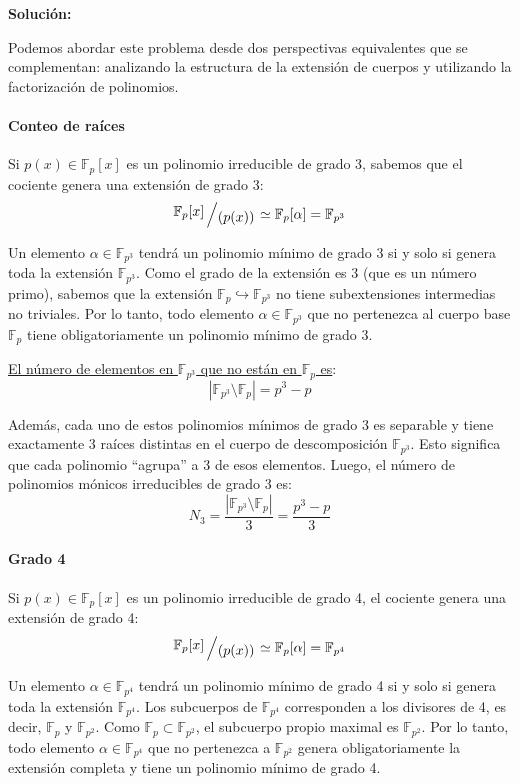 \begin{enumerate}
\begin{dem}
        \noindent\textbf{Solución:}

Podemos abordar este problema desde dos perspectivas equivalentes que se complementan: analizando la estructura de la extensión de cuerpos y utilizando la factorización de polinomios.

\paragraph{Conteo de raíces}
Si $p(x) \in \mathbb{F}_p[x]$ es un polinomio irreducible de grado 3, sabemos que el cociente genera una extensión de grado 3: 
\[ \modulo{\mathbb{F}_p[x]}{(p(x))} \simeq \mathbb{F}_p[\alpha] = \mathbb{F}_{p^3} \]

Un elemento $\alpha \in \mathbb{F}_{p^3}$ tendrá un polinomio mínimo de grado 3 si y solo si genera toda la extensión $\mathbb{F}_{p^3}$. 
Como el grado de la extensión es 3 (que es un número primo), sabemos que la extensión $\mathbb{F}_p \hookrightarrow \mathbb{F}_{p^3}$ no tiene subextensiones intermedias no triviales. Por lo tanto, todo elemento $\alpha \in \mathbb{F}_{p^3}$ que no pertenezca al cuerpo base $\mathbb{F}_p$ tiene obligatoriamente un polinomio mínimo de grado 3.

\underline{El número de elementos en $\mathbb{F}_{p^3}$ que no están en $\mathbb{F}_p$ es}:
\[ |\mathbb{F}_{p^3} \setminus \mathbb{F}_p| = p^3 - p \]

Además, cada uno de estos polinomios mínimos de grado 3 es separable y tiene exactamente 3 raíces distintas en el cuerpo de descomposición $\mathbb{F}_{p^3}$. Esto significa que cada polinomio ``agrupa'' a 3 de esos elementos.
Luego, el número de polinomios mónicos irreducibles de grado 3 es:
\[ N_3 = \frac{|\mathbb{F}_{p^3} \setminus \mathbb{F}_p|}{3} = \frac{p^3 - p}{3} \]

\paragraph{Grado 4}
Si $p(x) \in \mathbb{F}_p[x]$ es un polinomio irreducible de grado 4, el cociente genera una extensión de grado 4: 
\[ \modulo{\mathbb{F}_p[x]}{(p(x))} \simeq \mathbb{F}_p[\alpha] = \mathbb{F}_{p^4} \]

Un elemento $\alpha \in \mathbb{F}_{p^4}$ tendrá un polinomio mínimo de grado 4 si y solo si genera toda la extensión $\mathbb{F}_{p^4}$. 
Los subcuerpos de $\mathbb{F}_{p^4}$ corresponden a los divisores de 4, es decir, $\mathbb{F}_p$ y $\mathbb{F}_{p^2}$. Como $\mathbb{F}_p \subset \mathbb{F}_{p^2}$, el subcuerpo propio maximal es $\mathbb{F}_{p^2}$. Por lo tanto, todo elemento $\alpha \in \mathbb{F}_{p^4}$ que no pertenezca a $\mathbb{F}_{p^2}$ genera obligatoriamente la extensión completa y tiene un polinomio mínimo de grado 4.


\end{dem}
\end{enumerate}
